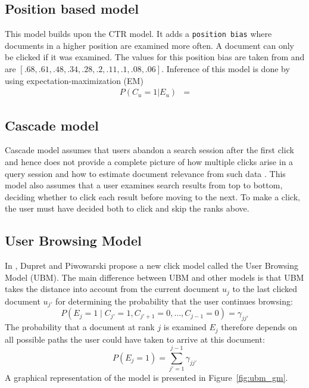\subsection{Position based model}
This model builds upon the CTR model. It adds a \texttt{position bias} where documents in a higher position are examined more often. A document can only be clicked if it was examined. The values for this position bias are taken from \cite{eye_track} and are $[.68, .61, .48, .34, .28, .2, .11, .1, .08, .06]$. Inference of this model is done by using expectation-maximization (EM)
\begin{align}
	P(C_{u}=1|E_{u}) &= 
\end{align}


\subsection{Cascade model}
Cascade model assumes that users abandon a search session after the first click and hence does not provide a complete picture of how multiple clicks arise in a query session and how to estimate document relevance from such data \cite{Kempe2008, Craswell2008}. 
This model also assumes that a user examines search results from top to bottom, deciding whether to click each result before moving to the next. 
To make a click, the user must have decided both to click and skip the ranks above.


\subsection{User Browsing Model}
In \cite{Dupret2008}, Dupret and Piwowarski propose a new click model called the User Browsing Model (UBM). The main difference between UBM and other models is that UBM takes the distance into account from the current document \(u_j\) to the last clicked document \(u_{j'}\) for determining the probability that the user continues browsing:
\[P(E_j =1 \mid C_{j'}=1, C_{j'+1}=0, \dots, C_{j-1}=0) = \gamma_{jj'}\]
The probability that a document at rank \(j\) is examined \(E_j\) therefore depends on all possible paths the user could have taken to arrive at this document:
\[P(E_j = 1) = \sum_{j'=1}^{j-1} \gamma_{jj'}\]
A graphical representation of the model is presented in Figure~\ref{fig:ubm_gm}.

